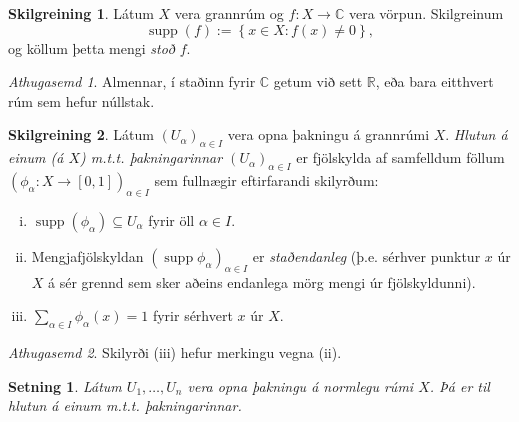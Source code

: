 \documentclass[a4paper,icelandic]{book}
\theoremstyle{definition}
\newtheorem{skilgr}{Skilgreining}[section]
\theoremstyle{plain}
\newtheorem{setn}{Setning}[section]
\theoremstyle{remark}
\newtheorem*{ath}{Athugasemd}
\newcommand{\R}{\mathbb{R}} %
\newcommand{\C}{\mathbb{C}} %
\DeclareMathOperator{\supp}{supp} %
\begin{document}
\begin{skilgr}
  Látum $X$ vera grannrúm og $f:X\to\C$ vera vörpun. Skilgreinum \[
  \supp(f) := \left\{ x\in X: f(x)\neq 0 \right\},
  \]
  og köllum þetta mengi \emph{stoð} $f$.
\end{skilgr}
\begin{ath}
  Almennar, í staðinn fyrir $\C$ getum við sett $\R$, eða bara eitthvert
  rúm sem hefur núllstak.
\end{ath}
\begin{skilgr}
  Látum $(U_\alpha)_{\alpha\in I}$ vera opna þakningu á grannrúmi $X$.
  \emph{Hlutun á einum (á $X$) m.t.t. þakningarinnar
  $(U_\alpha)_{\alpha\in I}$ } er fjölskylda af samfelldum föllum
  $\left( \phi_\alpha : X\to \left[ 0,1 \right] \right)_{\alpha\in I}$
  sem fullnægir eftirfarandi skilyrðum:
  \begin{enumerate}[(i)]
    \item $\supp(\phi_\alpha)\subseteq U_\alpha$ fyrir öll $\alpha\in
      I$.
    \item Mengjafjölskyldan $(\supp\phi_\alpha)_{\alpha\in I}$ er
      \emph{staðendanleg} (þ.e. sérhver punktur
      $x$ úr $X$ á sér grennd sem sker aðeins endanlega mörg mengi úr
      fjölskyldunni). 
    \item $\sum_{\alpha\in I}^{}\phi_\alpha(x) = 1$ fyrir sérhvert $x$
      úr $X$. 
  \end{enumerate}
\end{skilgr}
\begin{ath}
  Skilyrði (iii) hefur merkingu vegna (ii).
\end{ath}
\begin{setn}
  Látum $U_1,\dots,U_n$ vera opna þakningu á normlegu rúmi $X$. Þá er
  til hlutun á einum m.t.t. þakningarinnar.
\end{setn}
\end{document}
